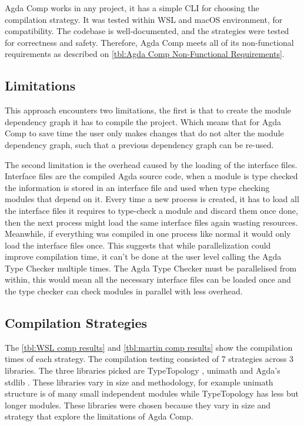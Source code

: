 Agda Comp works in any project, it has a simple CLI for
choosing the compilation strategy. It was tested within WSL and macOS
environment, for compatibility. The codebase is well-documented, and the
strategies were tested for correctness and safety. Therefore, Agda Comp
meets all of its non-functional requirements as described on \cref{tbl:Agda
Comp Non-Functional Requirements}.

\subsection{Limitations} \label{sub:eval comp limitations}

This approach encounters two limitations, the first is that to create the
module dependency graph it has to compile the project. Which means that for
Agda Comp to save time the user only makes changes that do not alter the module
dependency graph, such that a previous dependency graph can be re-used.

The second limitation is the overhead caused by the loading of the interface
files. Interface files are the compiled Agda source code, when a module is type
checked the information is stored in an interface file and used when type checking
modules that depend on it. Every time a new process is created, it has to load
all the interface files it requires to type-check a module and discard them
once done, then the next process might load the same interface files again
wasting resources. Meanwhile, if everything was compiled in one process like
normal it would only load the interface files once. This suggests that while
parallelization could improve compilation time, it can't be done at the user
level calling the Agda Type Checker multiple times. The Agda Type Checker must
be parallelised from within, this would mean all the necessary interface files
can be loaded once and the type checker can check modules in parallel with less
overhead.

\subsection{Compilation Strategies} \label{sub:eval comp strat}

The \cref{tbl:WSL comp results} and \cref{tbl:martin comp results} show the
compilation times of each strategy. The compilation testing consisted of 7
strategies across 3 libraries. The three libraries picked are TypeTopology
\cite{type-topology}, unimath \cite{agda-unimath} and Agda's stdlib
\cite{stdlib}. These libraries vary in size and methodology, for example
unimath structure is of many small independent modules while TypeTopology has
less but longer modules. These libraries were chosen because they vary in size
and strategy that explore the limitations of Agda Comp.

